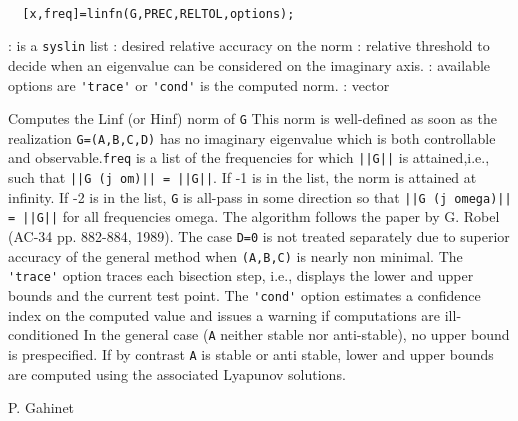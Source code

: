 \begin{mandesc}
   \\ %
\end{mandesc}
\begin{calling_sequence}
\begin{verbatim}
  [x,freq]=linfn(G,PREC,RELTOL,options);  
\end{verbatim}
\end{calling_sequence}
\begin{parameters}
  \begin{varlist}
    : is a \verb!syslin! list
    : desired relative accuracy on the norm
    : relative threshold to decide when an eigenvalue can be  considered on the imaginary axis.
    : available options are \verb!'trace'! or \verb!'cond'!
     is the computed norm.
    : vector
  \end{varlist}
\end{parameters}
\begin{mandescription}
  Computes the Linf (or Hinf) norm of \verb!G!
  This norm is well-defined as soon as the realization
  \verb!G=(A,B,C,D)! has no imaginary eigenvalue which is both 
  controllable and observable.\verb!freq! is a list of the frequencies for which \verb!||G||! is 
  attained,i.e., such that \verb!||G (j om)|| = ||G||!.
  If -1 is in the list, the norm is attained at infinity.
  If -2 is in the list, \verb!G! is all-pass in some direction so that 
  \verb!||G (j omega)|| = ||G||! for all frequencies omega.
  The algorithm follows the paper by G. Robel 
  (AC-34 pp. 882-884, 1989).
  The case \verb!D=0! is not treated separately due to superior 
  accuracy of the general method when \verb!(A,B,C)! is nearly 
  non minimal.
  The \verb!'trace'! option traces each bisection step, i.e., displays 
  the lower and upper bounds and the current test point.
  The \verb!'cond'! option estimates a confidence index on the computed 
  value and issues a warning if computations are 
  ill-conditioned
  In the general case (\verb!A! neither stable nor anti-stable), 
  no upper bound is  prespecified.
  If by contrast \verb!A! is stable or anti stable, lower
  and upper bounds are computed using the associated 
  Lyapunov solutions.
\end{mandescription}
\begin{manseealso}
\end{manseealso}
\begin{authors}
  P. Gahinet
\end{authors}

